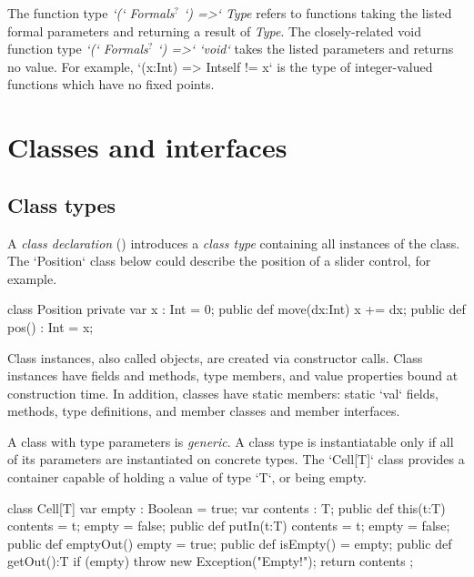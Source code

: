 The function type 
{\em \xcd`(` Formals{$^?$} \xcd`) =>`  Type} 
refers to functions taking the
listed formal parameters and returning a result of {\em Type}.  
The closely-related void function type 
{\em \xcd`(` Formals{$^?$} \xcd`) =>`  \xcd`void`}  takes the listed
parameters and returns no value.
For example, 
\xcd`(x:Int) => Int{self != x}` 
is the type of integer-valued functions which have no fixed points.  





\section{Classes and interfaces}
\label{ReferenceTypes}


\subsection{Class types}


A {\em class declaration} () introduces a {\em class type}
containing all instances of the class.  The \xcd`Position` class below
could describe the position of a slider control, for example.

\begin{xten}
class Position {
  private var x : Int = 0;
  public def move(dx:Int) { x += dx; }
  public def pos() : Int = x;
}
\end{xten}
%

Class instances, also called objects, are created via constructor calls. Class
instances have fields and methods, type members, and value properties bound at
construction time. In addition, classes have static members: static \xcd`val` fields,
methods, type definitions, and member classes and member interfaces.

A class with type parameters is {\em generic}. A class type is instantiatable
only if all of its parameters are instantiated on concrete types.  The
\xcd`Cell[T]` class provides a container capable of holding a value of type
\xcd`T`, or being empty.

\begin{xten}
class Cell[T] {
  var empty : Boolean = true;
  var contents : T;
  public def this(t:T) { 
     contents = t; empty = false; 
  }
  public def putIn(t:T) { 
    contents = t; empty = false; 
  }
  public def emptyOut() { empty = true; }
  public def isEmpty() = empty;
  public def getOut():T {
     if (empty) throw new Exception("Empty!");
     return contents ;
  }
}
\end{xten}
%


